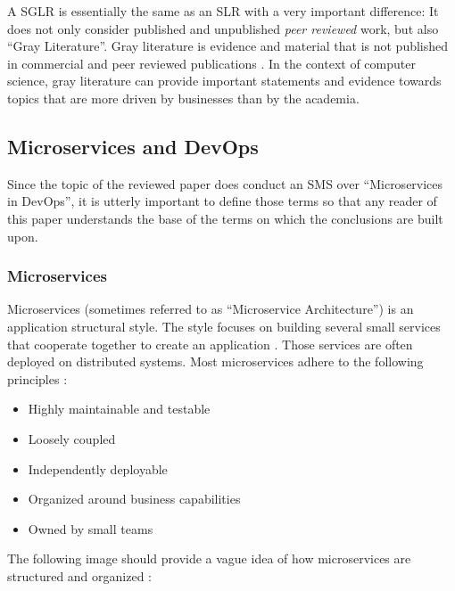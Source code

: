 A SGLR is essentially the same as an SLR with a very important difference:
It does not only consider published and unpublished \textit{peer reviewed} work,
but also ``Gray Literature''. Gray literature is evidence and material that
is not published in commercial and peer reviewed publications \cite{paez:GrayLiterature}.
In the context of computer science, gray literature can provide important statements
and evidence towards topics that are more driven by businesses than by the academia.


\subsection{Microservices and DevOps}

Since the topic of the reviewed paper does conduct an SMS over ``Microservices in DevOps'',
it is utterly important to define those terms so that any reader of this paper
understands the base of the terms on which the conclusions are built upon.

\subsubsection{Microservices}

Microservices (sometimes referred to as ``Microservice Architecture'') is an application
structural style. The style focuses on building several small services that cooperate
together to create an application \cite{richardson:whatIsMSA}. Those services are often deployed on distributed
systems. Most microservices adhere to the following principles \cite{richardson:whatIsMSA}:

\begin{itemize}
    \item Highly maintainable and testable
    \item Loosely coupled
    \item Independently deployable
    \item Organized around business capabilities
    \item Owned by small teams
\end{itemize}

The following image should provide a vague idea of how microservices are structured
and organized \cite{richardson:whatIsMSA}:

